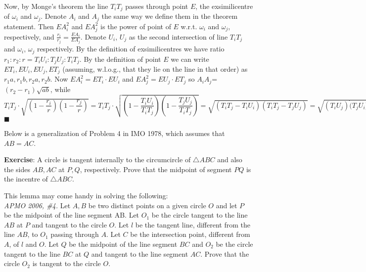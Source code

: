 \documentclass[11pt,a4paper]{article}
\begin{document}
Now, by Monge's theorem the line $T_iT_j$ passes through point $E$, the exsimilicentre of $\omega_i$ and $\omega_j$. Denote $A_i$ and $A_j$ the same way we define them in the theorem statement. Then $EA_i^{2}$ and $EA_j^{2}$ is the power of point of $E$ w.r.t. $\omega_i$ and $\omega_j$, respectively, and $\frac{r_i}{r_j}=\frac{EA_i}{EA_j}$. Denote $U_i$, $U_j$ as the second intersection of line $T_iT_j$ and $\omega_i$, $\omega_j$ respectively. By the definition of exsimilicentres we have ratio $r_1:r_2:r=T_iU_i:T_jU_j:T_iT_j.$ By the definition of point $E$ we can write $ET_i, EU_i, EU_j, ET_j$ (assuming, w.l.o.g., that they lie on the line in that order) as $r_1a, r_1b, r_2a, r_2b$. Now $EA_i^{2}=ET_i\cdot EU_i$ and $EA_j^{2}=EU_j\cdot ET_j$ so $A_iA_j$=$(r_2-r_1)\sqrt{ab}$, while $T_iT_j\cdot \sqrt{ ( 1-\dfrac{r_i}{r} ) (1-\dfrac{r_j}{r} ) }=T_iT_j\cdot \sqrt{ ( 1-\dfrac{T_iU_i}{T_iT_j} ) (1-\dfrac{T_jU_j}{T_iT_j} ) }=\sqrt{ ( T_iT_j-T_iU_i ) (T_iT_j-T_jU_j ) }=\sqrt{ (T_iU_j )\dot (T_jU_i ) }=\sqrt{a(r_2-r_1)\cdot b(r_2-r_1)}=(r_2-r_1)\sqrt{ab}.$ $\blacksquare$

Below is a generalization of Problem 4 in IMO 1978, which assumes that $AB=AC$.

\textbf {Exercise}: A circle is tangent internally to the circumcircle of $\triangle ABC$ and also the sides $AB, AC$ at $P, Q$, respectively. Prove that the midpoint of segment $PQ$ is the incentre of $\triangle ABC$.

This lemma may come handy in solving the following:\\
\emph{APMO 2006, \#4.} Let $A,B$ be two distinct points on a given circle $O$ and let $P$ be the midpoint of the line segment AB. Let $O_1$ be the circle tangent to the line $AB$ at $P$ and tangent to the circle $O$. Let $l$ be the tangent line, different from the line $AB$, to $O_1$ passing through $A$. Let $C$ be the intersection point, different from $A$, of $l$ and $O$. Let $Q$ be the midpoint of the line segment $BC$ and $O_2$ be the circle tangent to the line $BC$ at $Q$ and tangent to the line segment $AC$. Prove that the circle $O_2$ is tangent to the circle $O$.
\end{document}
